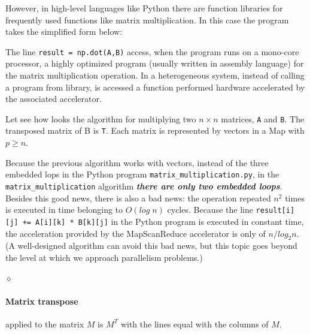 However, in high-level languages like Python there are function libraries for frequently used functions like matrix multiplication. In this case the program takes the simplified form below:

The line {\tt result = np.dot(A,B)} access, when the program runs on a mono-core processor, a highly optimized program (usually written in assembly language) for the matrix multiplication operation. In a heterogeneous system, instead of calling a program from library, is accessed a function performed hardware accelerated by the associated accelerator.

\begin{exemplu}
Let see how looks the algorithm for multiplying two $n \times n$ matrices, {\tt A} and {\tt B}. The transposed matrix of B is {\tt T}. Each matrix is represented by vectors in a Map with $p\geq n$.
{\em 
{}
}

Because the previous algorithm works with vectors, instead of the three embedded lops in the Python program {\tt matrix\_multiplication.py}, in the {\tt matrix\_multiplication} algorithm {\bf {\em there are only two embedded loops}}. Besides this good news, there is also a bad news: the operation repeated $n^2$ times is executed in time belonging to $O(log \; n)$ cycles. Because the line {\tt result[i][j] += A[i][k] * B[k][j]} in the Python program is executed in constant time, the acceleration provided by the MapScanReduce accelerator is only of $n/log_2 n$. (A well-designed algorithm can avoid this bad news, but this topic goes beyond the level at which we approach parallelism problems.)

$\diamond$
\end{exemplu}

\paragraph{Matrix transpose} applied to the matrix $M$ is $M^T$ with the lines equal with the columns of $M$.


